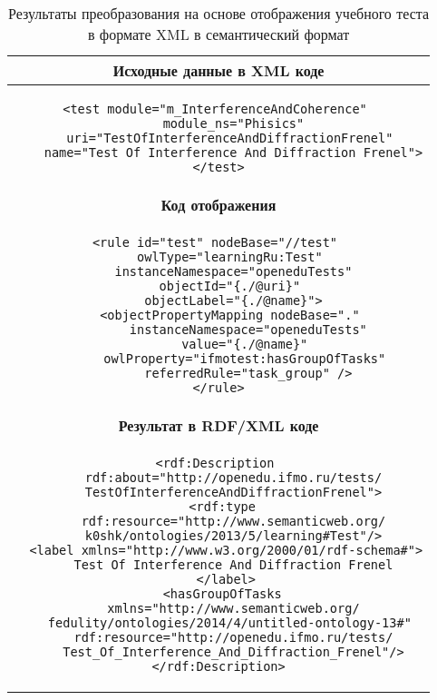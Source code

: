\begin{table}[h!]
\centering
\caption{Результаты преобразования на основе отображения учебного теста в формате XML в семантический формат}
\label{table:1}

\begin{tabular}{ |c|  }
  \hline
 \textbf{Исходные данные в XML коде}
 \\
 \hline
 \begin{lstlisting}
<test module="m_InterferenceAndCoherence" 
    module_ns="Phisics"
    uri="TestOfInterferenceAndDiffractionFrenel" 
    name="Test Of Interference And Diffraction Frenel">
</test>
 \end{lstlisting}
 \\
 \hline
  \textbf{Код отображения}
  \\
  \hline
\begin{lstlisting}
<rule id="test" nodeBase="//test" 
    owlType="learningRu:Test" 
    instanceNamespace="openeduTests"
    objectId="{./@uri}" 
    objectLabel="{./@name}">
    <objectPropertyMapping nodeBase="." 
        instanceNamespace="openeduTests"
        value="{./@name}" 
        owlProperty="ifmotest:hasGroupOfTasks" 
        referredRule="task_group" />
</rule>
\end{lstlisting}
    \\
 \hline
\textbf{Результат в RDF/XML коде}
\\
  \hline
  \begin{lstlisting}
<rdf:Description 
    rdf:about="http://openedu.ifmo.ru/tests/
    TestOfInterferenceAndDiffractionFrenel">
  <rdf:type 
    rdf:resource="http://www.semanticweb.org/
    k0shk/ontologies/2013/5/learning#Test"/>
  <label xmlns="http://www.w3.org/2000/01/rdf-schema#">
    Test Of Interference And Diffraction Frenel
  </label>
  <hasGroupOfTasks 
    xmlns="http://www.semanticweb.org/
    fedulity/ontologies/2014/4/untitled-ontology-13#" 
    rdf:resource="http://openedu.ifmo.ru/tests/
    Test_Of_Interference_And_Diffraction_Frenel"/>
</rdf:Description>
\end{lstlisting}

\\
 \hline
\end{tabular}

\end{table}

\clearpage
